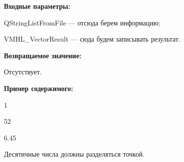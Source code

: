 \textbf{Входные параметры:}

QStringListFromFile --- отсюда берем информацию;

     VMHL\_VectorResult --- сюда будем записывать результат.

\textbf{Возвращаемое значение:}

Отсутствует.

\textbf{Пример содержимого:}

1

52

6.45

Десятичные числа должны разделяться точкой.